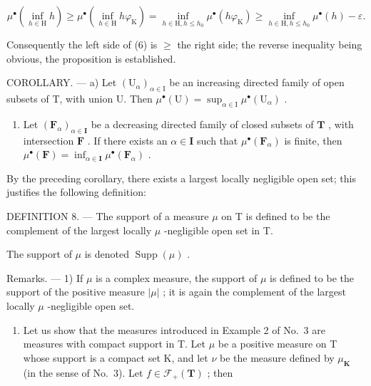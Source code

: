 \[
\mu^ {\bullet} \left(\inf _ {h \in \mathrm{H}} h\right) \geqslant \mu^ {\bullet} \left(\inf _ {h \in \mathrm{H}} h \varphi_ {\mathrm{K}}\right) = \inf _ {h \in \mathrm{H}, h \leqslant h _ {0}} \mu^ {\bullet} (h \varphi_ {\mathrm{K}}) \geqslant \inf _ {h \in \mathrm{H}, h \leqslant h _ {0}} \mu^ {\bullet} (h) - \varepsilon .
\]

Consequently the left side of (6) is \(\geqslant\) the right side; the reverse inequality being obvious, the proposition is established.

COROLLARY. --- a) Let \((\mathrm{U}_{\alpha})_{\alpha \in \mathrm{I}}\) be an increasing directed family of open subsets of T, with union U. Then \(\mu^{\bullet}(\mathrm{U}) = \sup_{\alpha \in \mathrm{I}} \mu^{\bullet}(\mathrm{U}_{\alpha})\) .

\begin{enumerate}
\def\labelenumi{\alph{enumi})}
\setcounter{enumi}{1}
\tightlist
\item
  Let \((\mathbf{F}_{\alpha})_{\alpha \in \mathbf{I}}\) be a decreasing directed family of closed subsets of \(\mathbf{T}\) , with intersection \(\mathbf{F}\) . If there exists an \(\alpha \in \mathbf{I}\) such that \(\mu^{\bullet}(\mathbf{F}_{\alpha})\) is finite, then \(\mu^{\bullet}(\mathbf{F}) = \inf_{\alpha \in \mathbf{I}} \mu^{\bullet}(\mathbf{F}_{\alpha})\) .
\end{enumerate}

By the preceding corollary, there exists a largest locally negligible open set; this justifies the following definition:

DEFINITION 8. --- The support of a measure \(\mu\) on T is defined to be the complement of the largest locally \(\mu\) -negligible open set in T.

The support of \(\mu\) is denoted \(\operatorname{Supp}(\mu)\) .

Remarks. --- 1) If \(\mu\) is a complex measure, the support of \(\mu\) is defined to be the support of the positive measure \(|\mu|\) ; it is again the complement of the largest locally \(\mu\) -negligible open set.

\begin{enumerate}
\def\labelenumi{\arabic{enumi})}
\setcounter{enumi}{1}
\tightlist
\item
  Let us show that the measures introduced in Example 2 of No.~3 are measures with compact support in T. Let \(\mu\) be a positive measure on T whose support is a compact set K, and let \(\nu\) be the measure defined by \(\mu_{\mathbf{K}}\) (in the sense of No.~3). Let \(f \in \mathcal{F}_{+}(\mathbf{T})\) ; then
\end{enumerate}

